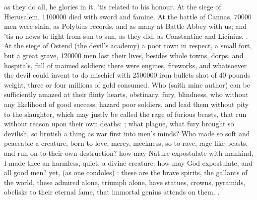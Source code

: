 {as they do all, he glories in it, 'tis related to his honour. At the
siege of Hierusalem, 1\thinspace{}100\thinspace{}000 died with sword and famine. At the
battle of Cannas, 70\thinspace{}000 men were slain, as Polybius records, and
as many at Battle Abbey with us; and 'tis no news to fight from sun to
sun, as they did, as Constantine and Licinius, \etc{}. At the siege of
Ostend (the devil's academy) a poor town in respect, a small fort, but
a great grave, 120\thinspace{}000 men lost their lives, besides whole towns,
dorps, and hospitals, full of maimed soldiers; there were engines,
fireworks, and whatsoever the devil could invent to do mischief with
2\thinspace{}500\thinspace{}000 iron bullets shot of 40 pounds weight, three or four millions
of gold consumed. Who (saith mine author) can be sufficiently
amazed at their flinty hearts, obstinacy, fury, blindness, who without
any likelihood of good success, hazard poor soldiers, and lead them
without pity to the slaughter, which may justly be called the rage of
furious beasts, that run without reason upon their own deaths:
; what plague, what
fury brought so devilish, so brutish a thing as war first into men's
minds? Who made so soft and peaceable a creature, born to love, mercy,
meekness, so to rave, rage like beasts, and run on to their own
destruction? how may Nature expostulate with mankind,  I made thee an harmless, quiet, a divine creature:
how may God expostulate, and all good men? yet,  (as
one condoles) : these
are the brave spirits, the gallants of the world, these admired alone,
triumph alone, have statues, crowns, pyramids, obelisks to their
eternal fame, that immortal genius attends on them, .

}
